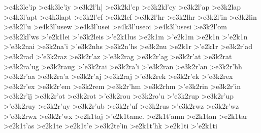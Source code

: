 {		>e4k3le'ip		%
		>e4k3le'iy		%
	>e3k2l'h|		%
	>e3k2kl'ep		%
	>e3k2kl'ey		%
	>e3k2l'ap   		%
	>e3k2lap		%
		>e4k3l'apt  		%
		>e4k3lapt
	>e3k2l'ef		%
	>e3k2lef		%
	>e3k2l'hr		%
	>e3k2lhr 		%
	>e3k2l'in		%
	>e3k2lin		%
	>e3k2l'u		%
		>e4k3l'usew		%
		>e4k3l'usei
		>e4k3l'useoi
		>e4k3l'usesi
	>e3k2l'om   		%
	>e3k2kl'ws		%
>'e2k1lei       		%
	>'e3k2leis		%
>'e2k1lus	       		%
>e2k1m
>'e2k1m
>e2k1n
>'e2k1n
	>'e3k2nai		%
	>e3k2na'i		%
	>'e3k2nhs		%
	>e3k2n'hs		%
	>e3k2nu    		%
>e2k1r
>'e2k1r
	>e3k2r'ad		%
	>e3k2rad
	>'e3k2raz		%
	>e3k2r'az
	>'e3k2rag		%
	>e3k2r'ag
	>e3k2r'at		%
	>e3k2rat
	>e3k2ra'ug		%
	>e3k2raug
	>'e3k2rai		%
	>e3k2ra'i
	>'e3k2ran		%
	>e3k2r'an
	>e3k2r'hh		%
	>e3k2r'aa
	>e3k2ra'a
	>e3k2r'aj  		%
	>e3k2raj
	>'e3k2rek		%
	>e3k2r'ek
	>'e3k2rex 		%
	>e3k2r'ex
	>e3k2r'em		%
	>e3k2rem
	>e3k2r'hm		%
	>e3k2rhm
	>'e3k2rin		%
	>e3k2r'in
	>e3k2r'ij
	>e3k2r'ot		%
	>e3k2rot
	>'e3k2rou		%
	>e3k2ro'u
	>'e3k2rup  		%
	>e3k2r'up 		%
	>'e3k2ruy
	>e3k2r'uy
	>e3k2r'ub
	>e3k2r'uf
	>e3k2rus  		%
	>'e3k2rwz  		%
	>e3k2r'wz
	>'e3k2rwx  		%
	>e3k2r'wx
>e2k1taj  		%
>'e2k1tame. 		%
>e2k1t'amn  		%
>e2k1tan    		%
>e2k1tar   		%
>e2k1t'as   		%
>e2k1te
>e2k1t'e
	>e3k2te'in		%
>e2k1t'hk   		%
>e2k1ti
>'e2k1ti
}
